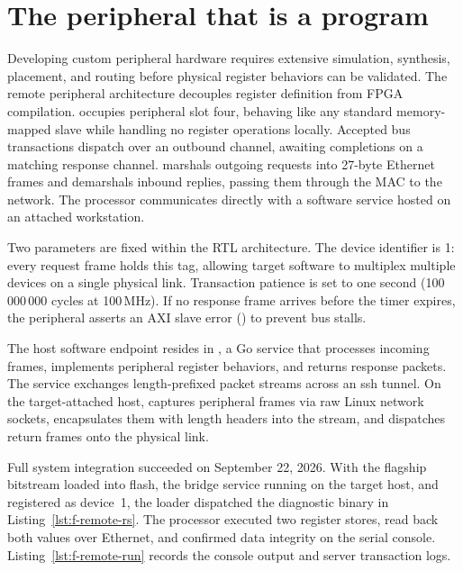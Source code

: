 \documentclass[journal,9pt]{IEEEtran}
\begin{document}
\section{The peripheral that is a program}
\label{sec:f-remote}

Developing custom peripheral hardware requires extensive simulation, synthesis,
placement, and routing before physical register behaviors can be validated. The
remote peripheral architecture decouples register definition from FPGA
compilation.  occupies peripheral slot four, behaving like any
standard memory-mapped slave while handling no register operations locally.
Accepted bus transactions dispatch over an outbound channel, awaiting
completions on a matching response channel.  marshals outgoing
requests into 27-byte Ethernet frames and demarshals inbound replies, passing
them through the MAC to the network. The processor communicates directly with a
software service hosted on an attached workstation.



Two parameters are fixed within the RTL architecture. The device identifier
is 1: every request frame holds this tag, allowing target software to multiplex
multiple devices on a single physical link. Transaction patience is set to one
second (100\,000\,000 cycles at 100\,MHz). If no response frame arrives before
the timer expires, the peripheral asserts an AXI slave error ()
to prevent bus stalls.

The host software endpoint resides in , a Go service that
processes incoming frames, implements peripheral register behaviors, and
returns response packets. The service exchanges length-prefixed packet streams
across an ssh tunnel. On the target-attached host, 
captures peripheral frames via raw Linux network sockets, encapsulates them
with length headers into the stream, and dispatches return frames onto the
physical link.

Full system integration succeeded on September 22, 2026. With the flagship
bitstream loaded into flash, the bridge service running on the target host, and
 registered as device~1, the loader dispatched the
diagnostic binary in Listing~\ref{lst:f-remote-rs}. The processor executed two
register stores, read back both values over Ethernet, and confirmed data
integrity on the serial console. Listing~\ref{lst:f-remote-run} records the
console output and server transaction logs.
\end{document}
